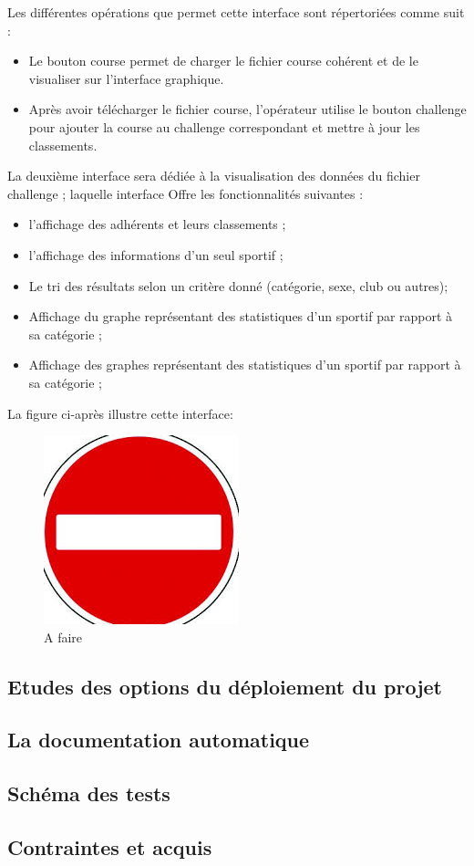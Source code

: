 Les différentes opérations que permet cette interface sont répertoriées comme suit : 
\begin{itemize} 
\item  Le bouton course permet de charger le fichier course cohérent et de le visualiser sur l’interface graphique.
\item Après avoir télécharger le fichier course, l’opérateur utilise le bouton challenge pour ajouter la course au challenge correspondant et mettre à jour les classements.
\end{itemize} 

La deuxième interface sera dédiée à la visualisation des données du fichier challenge ; laquelle interface 
Offre les fonctionnalités suivantes : 
\begin{itemize} 
\item l’affichage des adhérents et leurs classements ; 
 \item l’affichage des informations d’un seul sportif ;
 \item Le tri des résultats selon un critère donné (catégorie, sexe, club ou autres);
 \item Affichage du graphe représentant des statistiques d’un sportif par rapport à sa catégorie ;
 \item Affichage des graphes représentant des statistiques d’un sportif par rapport à sa catégorie ;
\end{itemize} 
La figure ci-après illustre cette interface:
\begin{figure}
	  \center
	  \includegraphics[scale=0.5]{img/A_faire.png}
	   \caption {A faire }
\end{figure}

 
\subsection {Etudes des options du déploiement du projet }

\subsection {La documentation automatique  }

\subsection {Schéma des tests }

\subsection {Contraintes et acquis }

